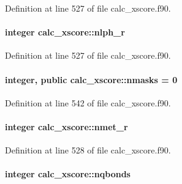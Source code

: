 Definition at line 527 of file calc\-\_\-xscore.\-f90.

\hypertarget{classcalc__xscore_a7be1f27a50f4224e7da2c0b513e43939}{
\paragraph[{nlph\-\_\-r}]{\setlength{\rightskip}{0pt plus 5cm}integer calc\-\_\-xscore\-::nlph\-\_\-r}}\label{classcalc__xscore_a7be1f27a50f4224e7da2c0b513e43939}


Definition at line 527 of file calc\-\_\-xscore.\-f90.

\hypertarget{classcalc__xscore_af693b82837ceeea888b600fda95b6d54}{
\paragraph[{nmasks}]{\setlength{\rightskip}{0pt plus 5cm}integer, public calc\-\_\-xscore\-::nmasks = 0}}\label{classcalc__xscore_af693b82837ceeea888b600fda95b6d54}


Definition at line 542 of file calc\-\_\-xscore.\-f90.

\hypertarget{classcalc__xscore_a1df505986db9df9844cf5dcdc9240158}{
\paragraph[{nmet\-\_\-r}]{\setlength{\rightskip}{0pt plus 5cm}integer calc\-\_\-xscore\-::nmet\-\_\-r}}\label{classcalc__xscore_a1df505986db9df9844cf5dcdc9240158}


Definition at line 528 of file calc\-\_\-xscore.\-f90.

\hypertarget{classcalc__xscore_a6a739af4d65860dd991b0487a33dcc70}{
\paragraph[{nqbonds}]{\setlength{\rightskip}{0pt plus 5cm}integer calc\-\_\-xscore\-::nqbonds}}\label{classcalc__xscore_a6a739af4d65860dd991b0487a33dcc70}


